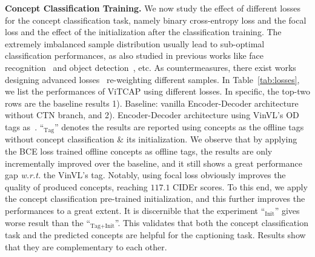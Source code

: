 \vspace{1mm}
\noindent\textbf{Concept Classification Training.}
We now study the effect of different losses for the concept classification task, namely binary cross-entropy loss and the focal loss and the effect of the initialization after the classification training. 
The extremely imbalanced sample distribution usually lead to sub-optimal classification performances, as also studied in previous works like face recognition~\citep{zhang2017range,ma2020learning} and object detection~\citep{li2020overcoming, ouyang2016factors}, etc. As countermeasures, there exist works designing advanced losses~\citep{lin2017focal,zhang2017range} re-weighting different samples. In Table~\ref{tab:losses}, we list the performances of ViTCAP using different losses. In specific, the top-two rows are the baseline results 1). Baseline: vanilla Encoder-Decoder architecture without CTN branch, and 2). Encoder-Decoder architecture using VinVL's OD tags as~\citep{li2020oscar}. ``$_\text{Tag}$'' denotes the results are reported using concepts as the offline tags without concept classification \& its initialization. We observe that by applying the BCE loss trained offline concepts as offline tags, the results are only incrementally improved over the baseline, and it still shows a great performance gap \textit{w.r.t.} the VinVL's tag. Notably, using focal loss obviously improves the quality of produced concepts, reaching $117.1$ CIDEr scores. To this end, we apply the concept classification pre-trained initialization, and this
further improves the performances to a great extent. It is discernible that the experiment ``$_\text{Init}$'' gives worse result than the ``$_\text{Tag+Init}$''. This validates that both the concept classification task and the predicted concepts are helpful for the captioning task. Results show that they are complementary to each other.


\begin{table}[h]
\centering
\setlength{\tabcolsep}{4pt} %
\renewcommand{\arraystretch}{1.15} %
\caption{\small Performances of VitCAP using different strategies for concept tokenization. 
}
\label{tab:tokenizer}
\end{table} 

